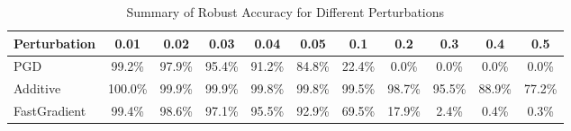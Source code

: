 \documentclass{article}
\begin{document}
\begin{table}[htbp]
\centering
\caption{Summary of Robust Accuracy for Different Perturbations}
\label{tab:robust_accuracy}
\begin{tabular}{lcccccccccc} %
\toprule
\textbf{Perturbation} & \textbf{0.01} & \textbf{0.02} & \textbf{0.03} & \textbf{0.04} & \textbf{0.05} & \textbf{0.1} & \textbf{0.2} & \textbf{0.3} & \textbf{0.4} & \textbf{0.5} \\
\midrule
PGD                  & 99.2\% & 97.9\% & 95.4\% & 91.2\% & 84.8\% & 22.4\% & 0.0\%  & 0.0\%  & 0.0\%  & 0.0\% \\
Additive             & 100.0\% & 99.9\% & 99.9\% & 99.8\% & 99.8\% & 99.5\% & 98.7\% & 95.5\% & 88.9\% & 77.2\% \\
FastGradient         & 99.4\% & 98.6\% & 97.1\% & 95.5\% & 92.9\% & 69.5\% & 17.9\% & 2.4\%  & 0.4\%  & 0.3\% \\
\bottomrule
\end{tabular}
\end{table}
\end{document}
